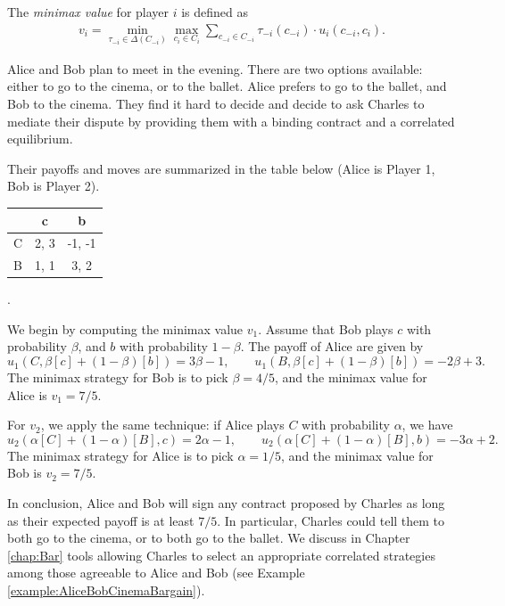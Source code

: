 \begin{definition}[Minimax]
The \emph{minimax value} for player $i$ is defined as
\begin{align*}
v_i = \min_{\tau_{-i} \in \Delta(C_{-i})} \max_{c_i \in C_i} \sum_{c_{-i} \in C_{-i}} \tau_{-i}(c_{-i}) \cdot u_i(c_{-i}, c_i).
\end{align*}
\end{definition}
\begin{example}
\label{ch5:ex:minimax}
Alice and Bob plan to meet in the evening. There are two options available: either to go to the cinema, or to the ballet.
Alice prefers to go to the ballet, and Bob to the cinema. They find it hard to decide and decide to ask Charles to mediate their dispute by providing them with a binding contract and a correlated equilibrium.

Their payoffs and moves are summarized in the table below (Alice is Player 1, Bob is Player 2).
\begin{center}
\begin{tabular}{c | c  c}
& c & b\\
\hline
C & 2, 3 & -1, -1  \\
B & 1, 1 & 3, 2
\end{tabular}
.
\end{center}

We begin by computing the minimax value $v_1$. Assume that Bob plays $c$ with probability $\beta$, and $b$ with probability $1-\beta$.
The payoff of Alice are given by
$$ u_{1}(C, \beta[c] + (1-\beta)[b]) = 3\beta - 1, \qquad u_{1}(B, \beta[c] + (1-\beta)[b]) = -2\beta + 3.  $$
The minimax strategy for Bob is to pick $\beta = 4/5$, and the minimax value for Alice is $v_1 = 7/5$.

For $v_2$, we apply the same technique: if Alice plays $C$ with probability $\alpha$, we have
$$ u_{2}(\alpha [C] + (1-\alpha)[B], c) = 2 \alpha - 1, \qquad u_{2}(\alpha [C] + (1-\alpha)[B], b) = -3\alpha + 2.  $$
The minimax strategy for Alice is to pick $\alpha = 1/5$, and the minimax value for Bob is $v_2 = 7/5$.

In conclusion, Alice and Bob will sign any contract proposed by Charles as long as their expected payoff is at least $7/5$. In particular, Charles could tell them to both go to the cinema, or to both go to the ballet.
We  discuss in Chapter \ref{chap:Bar} tools allowing Charles to select an appropriate correlated strategies among those agreeable to Alice and Bob (see Example \ref{example:AliceBobCinemaBargain}).

\end{example}

